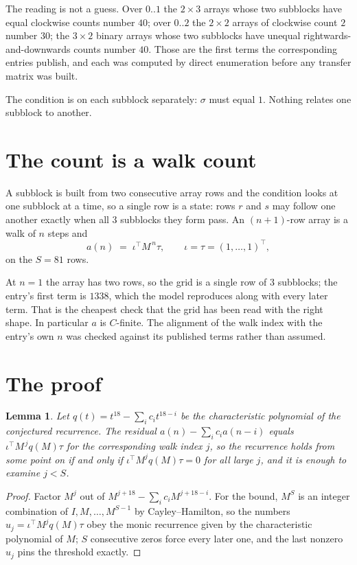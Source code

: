 \documentclass[11pt,a4paper]{article}
\theoremstyle{plain}
\newtheorem{lemma}[theorem]{Lemma}
\theoremstyle{definition}
\begin{document}
The reading is not a guess. Over $0..1$ the $2\times3$ arrays whose two subblocks have equal
clockwise counts number $40$; over $0..2$ the $2\times2$ arrays of clockwise count $2$ number
$30$; the $3\times2$ binary arrays whose two subblocks have unequal rightwards-and-downwards
counts number $40$. Those are the first terms the corresponding entries publish, and each was
computed by direct enumeration before any transfer matrix was built.

The condition is on each subblock separately: $\sigma$ must equal $1$. Nothing
relates one subblock to another.

\section{The count is a walk count}

A subblock is built from two consecutive array rows and the condition looks
at one subblock at a time, so a single row is a state: rows $r$ and $s$ may follow one another
exactly when all $3$ subblocks they form pass. An $(n+1)$-row array is a walk of $n$ steps and
\[
a(n)\;=\;\iota^{\!\top}M^{\,n}\tau,\qquad\iota=\tau=(1,\dots,1)^{\!\top},
\]
on the $S=81$ rows.

At $n=1$ the array has two rows, so the grid is a single row of $3$
subblocks; the entry's first term is $1338$, which the model
reproduces along with every later term. That is the cheapest check that the grid has been read
with the right shape.
In particular $a$ is $C$-finite. The alignment of the walk index with the entry's own $n$ was
checked against its published terms rather than assumed.

\section{The proof}

\begin{lemma}\label{lem:crit}
Let $q(t)=t^{18}-\sum_i c_it^{18-i}$ be the characteristic polynomial of the
conjectured recurrence. The residual $a(n)-\sum_ic_ia(n-i)$ equals
$\iota^{\!\top}M^{\,j}q(M)\tau$ for the corresponding walk index $j$, so the recurrence
holds from some point on if and only if $\iota^{\!\top}M^{j}q(M)\tau=0$ for all large $j$,
and it is enough to examine $j<S$.
\end{lemma}

\begin{proof}
Factor $M^{j}$ out of $M^{j+18}-\sum_ic_iM^{j+18-i}$. For the bound, $M^{S}$
is an integer combination of $I,M,\dots,M^{S-1}$ by Cayley--Hamilton, so the numbers
$u_j=\iota^{\!\top}M^{j}q(M)\tau$ obey the monic recurrence given by the characteristic
polynomial of $M$; $S$ consecutive zeros force every later one, and the last nonzero $u_j$
pins the threshold exactly.
\end{proof}
\end{document}
